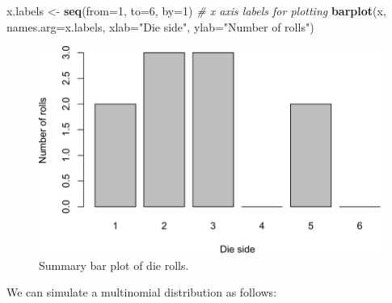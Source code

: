 \documentclass[
]{krantz}
\makeatletter
\newenvironment{Shaded}{\begin{snugshade}}{\end{snugshade}}
\newcommand{\AttributeTok}[1]{\textcolor[rgb]{0.27,0.27,0.27}{#1}}
\newcommand{\CommentTok}[1]{\textcolor[rgb]{0.37,0.37,0.37}{\textit{#1}}}
\newcommand{\DecValTok}[1]{\textcolor[rgb]{0.06,0.06,0.06}{#1}}
\newcommand{\FunctionTok}[1]{\textcolor[rgb]{0.27,0.27,0.27}{\textbf{#1}}}
\newcommand{\NormalTok}[1]{#1}
\newcommand{\OtherTok}[1]{\textcolor[rgb]{0.37,0.37,0.37}{#1}}
\newcommand{\StringTok}[1]{\textcolor[rgb]{0.5,0.5,0.5}{#1}}
\newenvironment{kframe}{%
\medskip{}
\setlength{\fboxsep}{.8em}
 \def\at@end@of@kframe{}%
 \ifinner\ifhmode%
  \def\at@end@of@kframe{\end{minipage}}%
  \begin{minipage}{\columnwidth}%
 \fi\fi%
 \def\FrameCommand##1{\hskip\@totalleftmargin \hskip-\fboxsep
 \colorbox{shadecolor}{##1}\hskip-\fboxsep
     \hskip-\linewidth \hskip-\@totalleftmargin \hskip\columnwidth}%
 \MakeFramed {\advance\hsize-\width
   \@totalleftmargin\z@ \linewidth\hsize
   \@setminipage}}%
 {\par\unskip\endMakeFramed%
 \at@end@of@kframe}
\renewenvironment{Shaded}{\begin{kframe}}{\end{kframe}}
\makeatother
\begin{document}
\begin{Shaded}
\begin{Highlighting}[]
\NormalTok{x.labels }\OtherTok{\textless{}{-}} \FunctionTok{seq}\NormalTok{(}\AttributeTok{from=}\DecValTok{1}\NormalTok{, }\AttributeTok{to=}\DecValTok{6}\NormalTok{, }\AttributeTok{by=}\DecValTok{1}\NormalTok{)  }\CommentTok{\# x axis labels for plotting}
\FunctionTok{barplot}\NormalTok{(x, }\AttributeTok{names.arg=}\NormalTok{x.labels, }\AttributeTok{xlab=}\StringTok{"Die side"}\NormalTok{, }\AttributeTok{ylab=}\StringTok{"Number of rolls"}\NormalTok{)}
\end{Highlighting}
\end{Shaded}

\begin{figure}
\includegraphics[width=0.9\linewidth]{bookdown_files/figure-latex/dieRoll-1} \caption{Summary bar plot of die rolls.}\label{fig:dieRoll}
\end{figure}

We can simulate a multinomial distribution as follows:
\end{document}
